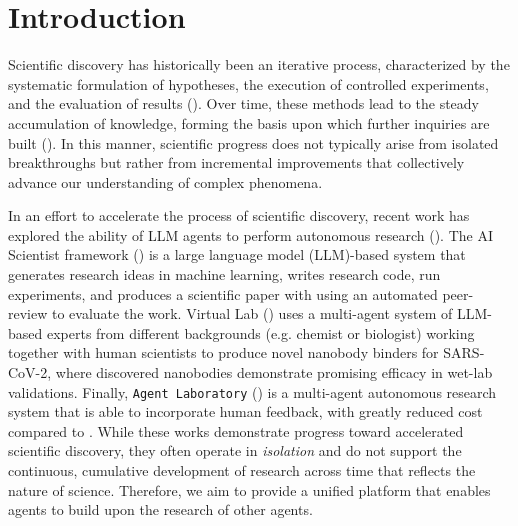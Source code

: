 \documentclass[11pt, a4paper]{include/gdm_format}
\begin{document}
\section{Introduction}


Scientific discovery has historically been an iterative process, characterized by the systematic formulation of hypotheses, the execution of controlled experiments, and the evaluation of results (\cite{chalmers2013thing}). Over time, these methods lead to the steady accumulation of knowledge, forming the basis upon which further inquiries are built (\cite{shapere1964structure}). In this manner, scientific progress does not typically arise from isolated breakthroughs but rather from incremental improvements that collectively advance our understanding of complex phenomena.

In an effort to accelerate the process of scientific discovery, recent work has explored the ability of LLM agents to perform autonomous research (\cite{schmidgall2025agent, swanson2024virtual, lu2024aiscientist}).  The AI Scientist framework (\cite{lu2024aiscientist}) is a large language model (LLM)-based system that generates research ideas in machine learning, writes research code, run experiments, and produces a scientific paper with using an automated peer-review to evaluate the work. Virtual Lab (\cite{swanson2024virtual}) uses a multi-agent system of LLM-based experts from different backgrounds (e.g. chemist or biologist) working together with human scientists to produce novel nanobody binders for SARS-CoV-2, where discovered nanobodies demonstrate promising efficacy in wet-lab validations. Finally, \texttt{Agent Laboratory} (\cite{schmidgall2025agent}) is a multi-agent autonomous research system that is able to incorporate human feedback, with greatly reduced cost compared to \cite{lu2024aiscientist}. While these works demonstrate progress toward accelerated scientific discovery, they often operate in \textit{isolation} and do not support the continuous, cumulative development of research across time that reflects the nature of science. Therefore, we aim to provide a unified platform that enables agents to build upon the research of other agents.
\end{document}
